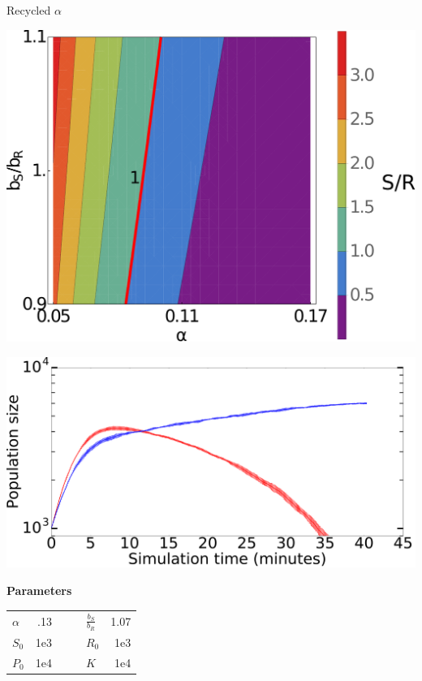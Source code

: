 \documentclass[final]{beamer}
\newlength{\onecolwid}
\newlength{\figwid}
\begin{document}
\begin{frame}[t]
\begin{block}
\begin{columns}[t]
\begin{column}{\onecolwid}
  \begin{block}{Recycled $\alpha$}
    \begin{center}
      \includegraphics[width=\figwid]{../dev/graphics/poster/recycled_contour.pdf}
      \vspace{1.5ex}
        \begin{minipage}[h]{0.6\onecolwid}
        \includegraphics[width=.9\figwid]{../dev/graphics/poster/recycled_pop.pdf}
      \end{minipage}%
      \begin{minipage}[h]{.3\onecolwid}
        \vfill \textbf{Parameters} \vspace{3mm}\\
        \begin{tabular}{l  r  c|c  l  r}
          \toprule
          $\alpha$ & .13 & \quad & \quad &
            $\frac{b_S}{b_R}$ & 1.07 \\
          $S_0$ & 1e3 & \quad & \quad &
            $R_0$ & 1e3 \\
          $P_0$ & 1e4 & \quad & \quad &
            $K$ & 1e4 \\
            \bottomrule
          \end{tabular}\\\vspace{1ex}


\end{minipage}
\end{center}
\end{block}
\end{column}
\end{columns}
\end{block}
\end{frame}
\end{document}
